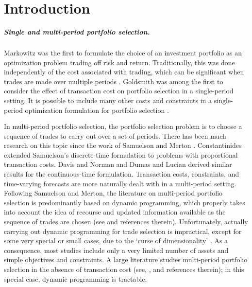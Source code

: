\documentclass[openany]{now}
\begin{document}
\chapter{Introduction}

\paragraph{Single and multi-period portfolio selection.}
Markowitz \cite{markowitz1952portfolio} was the first to formulate the choice of an
investment portfolio as an optimization problem trading off risk and return.
Traditionally, this was done independently of the cost associated
with trading, which can be significant when trades are made over
multiple periods \cite{kolm2014years}.
Goldsmith \cite{goldsmith1976transactions} was among the first to consider the
effect of transaction cost on portfolio selection in a single-period setting.
It is possible to include many other costs and constraints in a single-period
optimization formulation for portfolio selection \cite{lobo2007portfolio,moallemi2015dynamic}.

In multi-period portfolio selection, the portfolio selection problem is to choose
a sequence of trades to carry out over a set of periods.
There has been much research on this topic since the work of
Samuelson \cite{samuelson1969liftetime} and
Merton \cite{merton1969lifetime, merton1971optimum}.
Constantinides \cite{constantinides1979multiperiod} extended Samuelson's
discrete-time formulation to problems with proportional transaction costs.
Davis and Norman \cite{davis1990portfolio} and Dumas and Lucian \cite{dumas1991exact}
derived similar results for the continuous-time formulation.
Transaction costs, constraints, and time-varying forecasts are more
naturally dealt with in a multi-period setting.
Following Samuelson and Merton, the literature on multi-period portfolio selection is
predominantly based on dynamic programming, which properly takes into
account the idea of recourse and updated information available as the sequence of
trades are chosen (see \cite{garleanu2013dynamic} and references therein).
Unfortunately, actually carrying out dynamic programming
for trade selection is impractical, except for some very special or small cases,
due to the `curse of dimensionality' \cite{bellman1956dynamic,boyd2014performance}.
As a consequence, most studies include only a very limited number of assets
and simple objectives and constraints.
A large literature studies multi-period portfolio selection
in the absence of transaction cost (see, \eg, \cite{campbell2002strategic} and
references therein); in this special case, dynamic programming is tractable.
\end{document}
